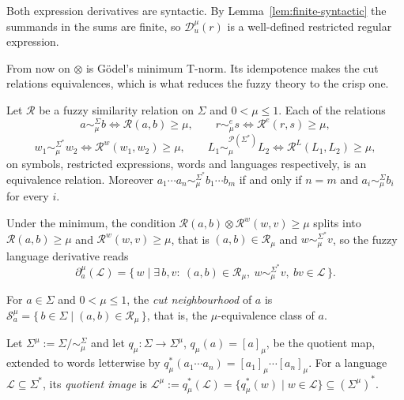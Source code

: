 Both expression derivatives are syntactic. By
Lemma~\ref{lem:finite-syntactic} the summands in the sums are finite, so
$\mathcal{D}_u^{\mu}(r)$ is a well-defined restricted regular expression.

From now on $\otimes$ is Gödel's minimum T-norm. Its idempotence makes
the cut relations equivalences, which is what reduces the fuzzy theory to the
crisp one.

\begin{proposition}\label{prop:cut-equivalence}
Let $\mathcal{R}$ be a fuzzy similarity relation on $\Sigma$ and $0<\mu\le1$. Each of
the relations
\[
a\sim_\mu^{\Sigma} b \iff \mathcal{R}(a,b)\ge\mu, \qquad
r\sim_\mu^{e} s \iff \mathcal{R}^{e}(r,s)\ge\mu,
\]
\[
w_1\sim_\mu^{\Sigma^{*}} w_2 \iff \mathcal{R}^{w}(w_1,w_2)\ge\mu, \qquad
L_1\sim_\mu^{\mathcal{P}(\Sigma^{*})} L_2 \iff \mathcal{R}^{L}(L_1,L_2)\ge\mu,
\]
on symbols, restricted expressions, words and languages respectively, is an
equivalence relation. Moreover $a_1\cdots a_n\sim_\mu^{\Sigma^{*}} b_1\cdots b_m$ if
and only if $n=m$ and $a_i\sim_\mu^{\Sigma} b_i$ for every $i$.
\end{proposition}

Under the minimum, the condition $\mathcal{R}(a,b)\otimes\mathcal{R}^{w}(w,v)\ge\mu$
splits into $\mathcal{R}(a,b)\ge\mu$ and $\mathcal{R}^{w}(w,v)\ge\mu$, that is
$(a,b)\in\mathcal{R}_\mu$ and $w\sim_\mu^{\Sigma^{*}} v$, so the fuzzy language
derivative reads
\[
\partial_a^{\mu}(\mathcal{L})
= \{\,w\mid \exists\, b,v:\ (a,b)\in\mathcal{R}_\mu,\ w\sim_\mu^{\Sigma^{*}} v,\ bv\in\mathcal{L}\,\}.
\]

\begin{definition}\label{def:cut-neighborhood}
For $a\in\Sigma$ and $0<\mu\le1$, the \emph{cut neighbourhood} of $a$ is
$\mathcal{S}_a^{\mu}=\{\,b\in\Sigma\mid (a,b)\in\mathcal{R}_\mu\,\}$, that is, the
$\mu$-equivalence class of $a$.
\end{definition}

\begin{definition}\label{def:quotient}
Let $\Sigma^{\mu}:=\Sigma/{\sim_\mu^{\Sigma}}$ and let $q_\mu:\Sigma\to\Sigma^{\mu}$,
$q_\mu(a)=[a]_\mu$, be the quotient map, extended to words letterwise by
$q_\mu^{*}(a_1\cdots a_n)=[a_1]_\mu\cdots[a_n]_\mu$. For a language
$\mathcal{L}\subseteq\Sigma^{*}$, its \emph{quotient image} is
$\mathcal{L}^{\mu}:=q_\mu^{*}(\mathcal{L})=\{q_\mu^{*}(w)\mid w\in\mathcal{L}\}
\subseteq(\Sigma^{\mu})^{*}$.
\end{definition}

